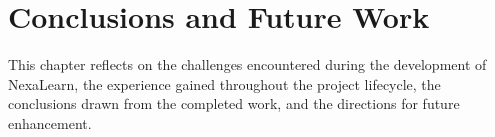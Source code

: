 
\chapter{Conclusions and Future Work}
\label{ch:conclusions}

This chapter reflects on the challenges encountered during the development of NexaLearn, the experience gained throughout the project lifecycle, the conclusions drawn from the completed work, and the directions for future enhancement.





